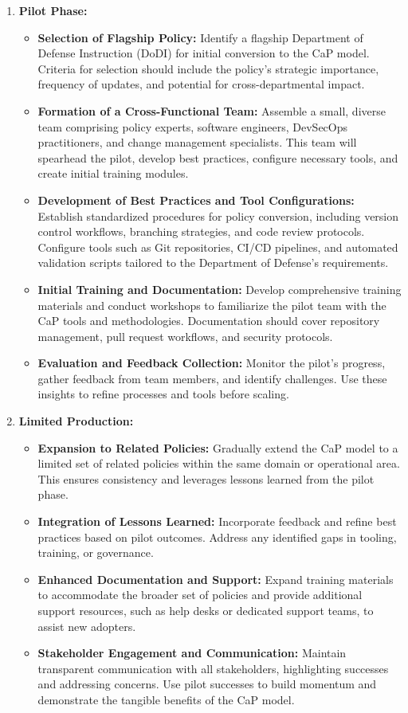 \documentclass[11pt]{article}
\begin{document}
\begin{enumerate}
    \item \textbf{Pilot Phase:}
    \begin{itemize}
        \item \textbf{Selection of Flagship Policy:} Identify a flagship Department of Defense Instruction (DoDI) for initial conversion to the CaP model. Criteria for selection should include the policy's strategic importance, frequency of updates, and potential for cross-departmental impact.
        \item \textbf{Formation of a Cross-Functional Team:} Assemble a small, diverse team comprising policy experts, software engineers, DevSecOps practitioners, and change management specialists. This team will spearhead the pilot, develop best practices, configure necessary tools, and create initial training modules.
        \item \textbf{Development of Best Practices and Tool Configurations:} Establish standardized procedures for policy conversion, including version control workflows, branching strategies, and code review protocols. Configure tools such as Git repositories, CI/CD pipelines, and automated validation scripts tailored to the Department of Defense's requirements.
        \item \textbf{Initial Training and Documentation:} Develop comprehensive training materials and conduct workshops to familiarize the pilot team with the CaP tools and methodologies. Documentation should cover repository management, pull request workflows, and security protocols.
        \item \textbf{Evaluation and Feedback Collection:} Monitor the pilot's progress, gather feedback from team members, and identify challenges. Use these insights to refine processes and tools before scaling.
    \end{itemize}

    \item \textbf{Limited Production:}
    \begin{itemize}
        \item \textbf{Expansion to Related Policies:} Gradually extend the CaP model to a limited set of related policies within the same domain or operational area. This ensures consistency and leverages lessons learned from the pilot phase.
        \item \textbf{Integration of Lessons Learned:} Incorporate feedback and refine best practices based on pilot outcomes. Address any identified gaps in tooling, training, or governance.
        \item \textbf{Enhanced Documentation and Support:} Expand training materials to accommodate the broader set of policies and provide additional support resources, such as help desks or dedicated support teams, to assist new adopters.
        \item \textbf{Stakeholder Engagement and Communication:} Maintain transparent communication with all stakeholders, highlighting successes and addressing concerns. Use pilot successes to build momentum and demonstrate the tangible benefits of the CaP model.
    \end{itemize}


\end{enumerate}
\end{document}

